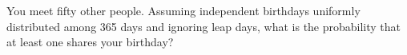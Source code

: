 You meet fifty other people. Assuming independent birthdays uniformly distributed among 365 days and ignoring leap days, what is the probability that at least one shares your birthday?
